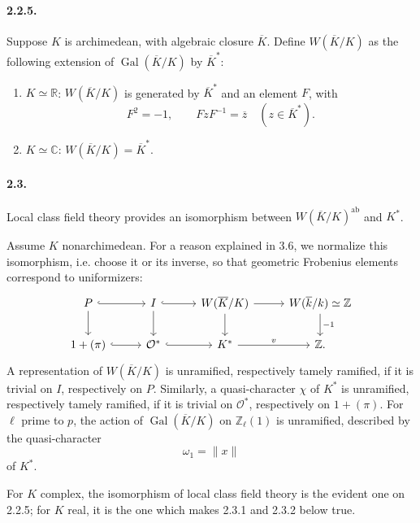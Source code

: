 \documentclass[10pt]{article}
\newcommand{\C}{\mathbb C}
\newcommand{\Z}{\mathbb Z}
\newcommand{\Gal}{\operatorname{Gal}}
\providecommand{\ab}{\mathrm{ab}}
\providecommand{\R}{\mathbb R}
\providecommand{\ab}{\mathrm{ab}}
\providecommand{\ab}{\mathrm{ab}}
\providecommand{\Gal}{\operatorname{Gal}}
\providecommand{\Gal}{\operatorname{Gal}}
\providecommand{\Gal}{\operatorname{Gal}}
\providecommand{\Gal}{\operatorname{Gal}}
\begin{document}
\paragraph{2.2.5.} Suppose \(K\) is archimedean, with algebraic closure \(\overline K\). Define \(W(\overline K/K)\) as the following extension of \(\Gal(\overline K/K)\) by \(\overline K^*\):
\begin{enumerate}[label=\arabic*)]
\item \(K\simeq\R\): \(W(\overline K/K)\) is generated by \(\overline K^*\) and an element \(F\), with
\[
F^2=-1,\qquad FzF^{-1}=\overline z\quad(z\in\overline K^*).
\]
\item \(K\simeq\C\): \(W(\overline K/K)=\overline K^*\).
\end{enumerate}

\paragraph{2.3.} Local class field theory provides an isomorphism between \(W(\overline K/K)^{\ab}\) and \(K^*\).

Assume \(K\) nonarchimedean. For a reason explained in 3.6, we normalize this isomorphism, i.e. choose it or its inverse, so that geometric Frobenius elements correspond to uniformizers:
\[
\begin{tikzcd}[column sep=2.7em,row sep=1.9em]
P \arrow[r,hook] \arrow[d] & I \arrow[r,hook] \arrow[d] &
W(\overline K/K) \arrow[r] \arrow[d] &
W(\overline k/k)\simeq\Z \arrow[d,"{-1}"]\\
1+(\pi) \arrow[r,hook] & \mathcal O^* \arrow[r,hook] &
K^* \arrow[r,"v"] & \Z .
\end{tikzcd}
\]
A representation of \(W(\overline K/K)\) is unramified, respectively tamely ramified, if it is trivial on \(I\), respectively on \(P\). Similarly, a quasi-character \(\chi\) of \(K^*\) is unramified, respectively tamely ramified, if it is trivial on \(\mathcal O^*\), respectively on \(1+(\pi)\). For \(\ell\) prime to \(p\), the action of \(\Gal(\overline K/K)\) on \(\Z_\ell(1)\) is unramified, described by the quasi-character
\[
\omega_1=\|x\|
\]
of \(K^*\).

For \(K\) complex, the isomorphism of local class field theory is the evident one on 2.2.5; for \(K\) real, it is the one which makes 2.3.1 and 2.3.2 below true.
\end{document}

